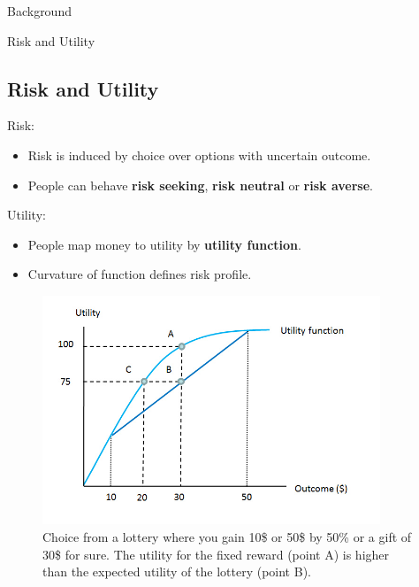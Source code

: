 \begin{exampleblock}{Background}

\begin{block}{Risk and Utility}
\subsection{Risk and Utility}

Risk: 
\begin{itemize}
    \item Risk is induced by choice over options with uncertain outcome.
    \item People can behave \textbf{risk seeking}, \textbf{risk neutral} or \textbf{risk averse}.
\end{itemize}

 Utility:
\begin{itemize}
    \item People map money to utility by \textbf{utility function}.
    \item Curvature of function defines risk profile.
\end{itemize}


\begin{figure}
  \centering
    \includegraphics[width=0.9\textwidth]{img/background/riskaversion.jpg}
  \caption{Choice from a lottery where you gain 10\$ or 50\$ by 50\% or a gift of 30\$ for sure. The utility for the fixed reward (point A) is higher than the expected utility of the lottery (point B).}
  
\end{figure}


\end{block}
\end{exampleblock}
